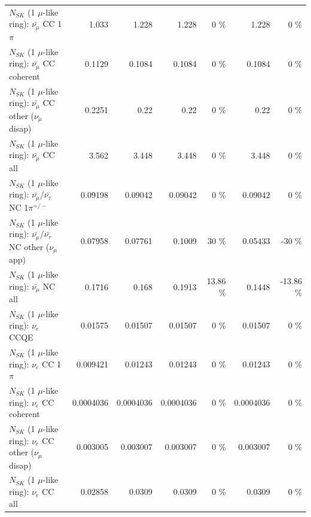 \begin{table}
\begin{tabular}{| l | r | r | r  r | r  r |}
                         $N_{SK}$ (1 $\mu$-like ring): $\bar{\nu_\mu}$ CC 1$\pi$ &           1.033 &           1.228 &           1.228 &        0 \%  &           1.228 &        0 \%  \\ 
                       $N_{SK}$ (1 $\mu$-like ring): $\bar{\nu_\mu}$ CC coherent &          0.1129 &          0.1084 &          0.1084 &        0 \%  &          0.1084 &        0 \%  \\ 
        $N_{SK}$ (1 $\mu$-like ring): $\bar{\nu_\mu}$ CC other ($\nu_\mu$ disap) &          0.2251 &            0.22 &            0.22 &        0 \%  &            0.22 &        0 \%  \\ 
                          $N_{SK}$ (1 $\mu$-like ring): $\bar{\nu_{\mu}}$ CC all &           3.562 &           3.448 &           3.448 &        0 \%  &           3.448 &        0 \%  \\ 
\hline
  $N_{SK}$ (1 $\mu$-like ring): $\bar{\nu_\mu}$/$\bar{\nu_\tau}$ NC 1$\pi^{+/-}$ &         0.09198 &         0.09042 &         0.09042 &        0 \%  &         0.09042 &        0 \%  \\ 
$N_{SK}$ (1 $\mu$-like ring): $\bar{\nu_\mu}$/$\bar{\nu_\tau}$ NC other ($\nu_\mu$ app) &         0.07958 &         0.07761 &          0.1009 &       30 \%  &         0.05433 &      -30 \%  \\ 
                          $N_{SK}$ (1 $\mu$-like ring): $\bar{\nu_{\mu}}$ NC all &          0.1716 &           0.168 &          0.1913 &    13.86 \%  &          0.1448 &   -13.86 \%  \\ 
\hline
\hline
\hline
                                      $N_{SK}$ (1 $\mu$-like ring): $\nu_e$ CCQE &         0.01575 &         0.01507 &         0.01507 &        0 \%  &         0.01507 &        0 \%  \\ 
                                 $N_{SK}$ (1 $\mu$-like ring): $\nu_e$ CC 1$\pi$ &        0.009421 &         0.01243 &         0.01243 &        0 \%  &         0.01243 &        0 \%  \\ 
                               $N_{SK}$ (1 $\mu$-like ring): $\nu_e$ CC coherent &       0.0004036 &       0.0004036 &       0.0004036 &        0 \%  &       0.0004036 &        0 \%  \\ 
                $N_{SK}$ (1 $\mu$-like ring): $\nu_e$ CC other ($\nu_\mu$ disap) &        0.003005 &        0.003007 &        0.003007 &        0 \%  &        0.003007 &        0 \%  \\ 
                                  $N_{SK}$ (1 $\mu$-like ring): $\nu_{e}$ CC all &         0.02858 &          0.0309 &          0.0309 &        0 \%  &          0.0309 &        0 \%  \\ 

\end{tabular}
\end{table}
